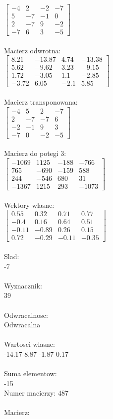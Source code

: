 \documentclass[a4paper,12pt]{article}
\begin{document}
$\begin{bmatrix} -4&2&-2&-7\\5&-7&-1&0\\2&-7&9&-2\\-7&6&3&-5 \end{bmatrix}$
\\
\\
Macierz odwrotna:\\

$\begin{bmatrix} 8.21&-13.87&4.74&-13.38\\5.62&-9.62&3.23&-9.15\\1.72&-3.05&1.1&-2.85\\-3.72&6.05&-2.1&5.85 \end{bmatrix}$
\\
\\
Macierz transponowana:\\

$\begin{bmatrix} -4&5&2&-7\\2&-7&-7&6\\-2&-1&9&3\\-7&0&-2&-5 \end{bmatrix}$
\\
\\
Macierz do potegi 3:\\

$\begin{bmatrix} -1069&1125&-188&-766\\765&-690&-159&588\\244&-546&680&31\\-1367&1215&293&-1073 \end{bmatrix}$
\\
\\
Wektory wlasne:\\

$\begin{bmatrix} 0.55&0.32&0.71&0.77\\-0.4&0.16&0.64&0.51\\-0.11&-0.89&0.26&0.15\\0.72&-0.29&-0.11&-0.35 \end{bmatrix}$
\\
\\
Slad:\\
-7
\\
\\
Wyznacznik:\\
39
\\
\\
Odwracalnosc:\\
Odwracalna
\\
\\
Wartosci wlasne:\\
-14.17 8.87 -1.87 0.17
\\
\\
Suma elementow:\\
-15
\\
\newpage
Numer macierzy:
487
\\
\\
Macierz:\\
\end{document}
